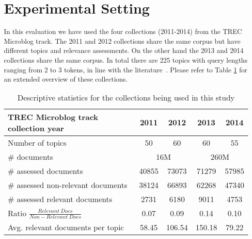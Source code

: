 \section{Experimental Setting}
\label{experiment}

 In this evaluation we have used the four collections (2011-2014) from the TREC Microblog track. The 2011 and 2012 collections share the same corpus but have different topics and relevance assessments. On the other hand the 2013 and 2014 collections share the same corpus. 
In total there are 225 topics with query lengths ranging from 2 to 3 tokens, in line with the literature~\cite{teevan2011twittersearch}. Please refer to Table \ref{collections} for an extended overview of these collections. \\




\begin{table}[]
\caption{Descriptive statistics for the collections being used in this study}
  	\centering
   \begin{tabular}{l||c|c|c|c} 
    \hline
	TREC Microblog track collection year & 2011 & 2012 & 2013 & 2014 \tabularnewline
	\hline
	Number of topics   & 50 & 60 & 60 & 55 \tabularnewline
    \hline
	\# documents & \multicolumn{2}{c|}{16M} & \multicolumn{2}{c}{260M}  \tabularnewline
    \hline
	\# assessed documents   & 40855 &  73073  & 71279 & 57985 \tabularnewline
    \hline
	\# assessed non-relevant documents & 38124 & 66893 & 62268 & 47340 \tabularnewline
	\hline
	\# assessed relevant documents  & 2731 &  6180 & 9011 & 4753\tabularnewline
	\hline
	Ratio \(\frac{Relevant~Docs}{Non-Relevant~Docs}\) & 0.07 &  0.09 & 0.14 & 0.10\tabularnewline
	\hline
	Avg. relevant documents per topic   & 58.45 &  106.54 & 150.18 & 79.22 \tabularnewline
	\hline
   \end{tabular}
   \label{collections}
   \vspace{0.5cm}
\end{table}

